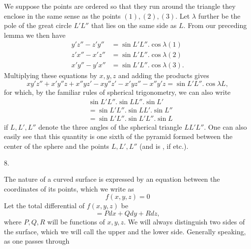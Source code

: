 \par{}%
\noindent\hspace*{1.2em}We suppose the points are ordered so that they run around the triangle they enclose in the same sense as the points $(1),(2),(3)$. Let $\lambda$ further be the pole of the great circle $L'L''$ that lies on the same side as $L$. From our preceding lemma we then have
\[
\begin{aligned}
y'z''-z'y''&=\sin L'L''.\cos\lambda(1)\\
z'x''-x'z''&=\sin L'L''.\cos\lambda(2)\\
x'y''-y'x''&=\sin L'L''.\cos\lambda(3).
\end{aligned}
\]
Multiplying these equations by $x,y,z$ and adding the products gives
\[
xy'z''+x'y''z+x''yz'-xy''z'-x'yz''-x''y'z=\sin L'L''.\cos\lambda L,
\]
for which, by the familiar rules of spherical trigonometry, we can also write
\[
\begin{aligned}
&\sin L'L''.\sin LL''.\sin L'\\
&=\sin L'L''.\sin LL'.\sin L''\\
&=\sin L'L''.\sin L'L''.\sin L
\end{aligned}
\]
if $L,L',L''$ denote the three angles of the spherical triangle $LL'L''$. One can also easily see that this quantity is one sixth of the pyramid formed between the center of the sphere and the points $L,L',L''$ (and is , if etc.).

\begin{center}8.\end{center}
\noindent\hspace*{1.2em}The nature of a curved surface is expressed by an equation between the coordinates of its points, which we write as
\[
f(x,y,z)=0
\]
Let the total differential of $f(x,y,z)$ be
\[
=Pdx+Qdy+Rdz,
\]
where $P,Q,R$ will be functions of $x,y,z$. We will always distinguish two sides of the surface, which we will call the upper and the lower side. Generally speaking, as one passes through\space%
